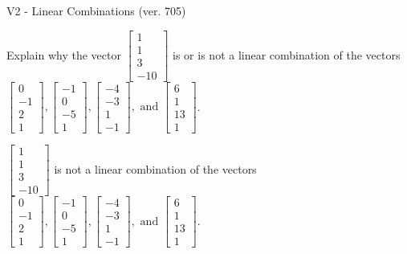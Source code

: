 \begin{exercise}
  \begin{exerciseTitle}V2 - Linear Combinations (ver. 705)\end{exerciseTitle}
  \begin{exerciseStatement}
    Explain why the vector \(\left[\begin{array}{c}
1 \\
1 \\
3 \\
-10
\end{array}\right]\)  is or is not a linear 
	combination of the vectors \(\left[\begin{array}{c}
0 \\
-1 \\
2 \\
1
\end{array}\right] , \left[\begin{array}{c}
-1 \\
0 \\
-5 \\
1
\end{array}\right] , \left[\begin{array}{c}
-4 \\
-3 \\
1 \\
-1
\end{array}\right] , \text{ and } \left[\begin{array}{c}
6 \\
1 \\
13 \\
1
\end{array}\right]\).
	


  \end{exerciseStatement}
  \begin{exerciseAnswer}
   \(\left[\begin{array}{c}
1 \\
1 \\
3 \\
-10
\end{array}\right]\) 
  	 is not  
	a linear combination of the vectors \(\left[\begin{array}{c}
0 \\
-1 \\
2 \\
1
\end{array}\right] , \left[\begin{array}{c}
-1 \\
0 \\
-5 \\
1
\end{array}\right] , \left[\begin{array}{c}
-4 \\
-3 \\
1 \\
-1
\end{array}\right] , \text{ and } \left[\begin{array}{c}
6 \\
1 \\
13 \\
1
\end{array}\right]\).


\end{exerciseAnswer}
\end{exercise}
